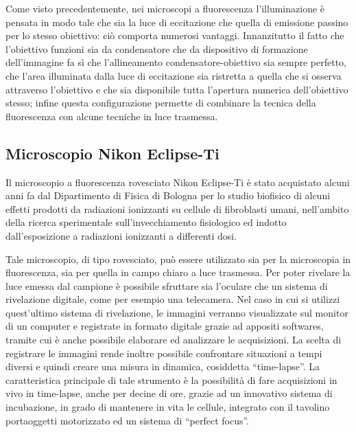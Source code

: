 Come visto precedentemente, nei microscopi a fluorescenza l'illuminazione è pensata in modo tale che sia la luce di eccitazione che quella di emissione passino per lo stesso obiettivo: ciò comporta numerosi vantaggi. 
Innanzitutto il fatto che l'obiettivo funzioni sia da condensatore che da dispositivo di formazione dell'immagine fa sì che l'allineamento condensatore-obiettivo sia sempre perfetto, che l'area illuminata dalla luce di eccitazione sia ristretta a quella che si osserva attraverso l'obiettivo e che sia disponibile tutta l'apertura numerica dell'obiettivo stesso; infine questa configurazione permette di combinare la tecnica della fluorescenza con alcune tecniche in luce trasmessa.


\subsection{Microscopio Nikon Eclipse-Ti}

Il microscopio a fluorescenza rovesciato Nikon Eclipse-Ti è stato acquistato alcuni anni fa dal Dipartimento di Fisica di Bologna per lo studio biofisico di alcuni effetti prodotti da radiazioni ionizzanti su cellule di fibroblasti umani, nell'ambito della ricerca sperimentale sull'invecchiamento fisiologico ed indotto dall'esposizione a radiazioni ionizzanti a differenti dosi. 

Tale microscopio, di tipo rovesciato, può essere utilizzato sia per la microscopia in fluorescenza, sia per quella in campo chiaro a luce trasmessa.
Per poter rivelare la luce emessa dal campione è possibile sfruttare sia l'oculare che un sistema di rivelazione digitale, come per esempio una telecamera.
Nel caso in cui si utilizzi quest'ultimo sistema di rivelazione, le immagini verranno visualizzate sul monitor di un computer e registrate in formato digitale grazie ad appositi softwares, tramite cui è anche possibile elaborare ed analizzare le acquisizioni. 
La scelta di registrare le immagini rende inoltre possibile confrontare situazioni a tempi diversi e quindi creare una misura in dinamica, cosiddetta ``time-lapse''. 
La caratteristica principale di tale strumento è la possibilità di fare acquisizioni in vivo in time-lapse, anche per decine di ore, grazie ad un innovativo sistema di incubazione, in grado di mantenere in vita le cellule, integrato con il tavolino portaoggetti motorizzato ed un sistema di ``perfect focus''.

